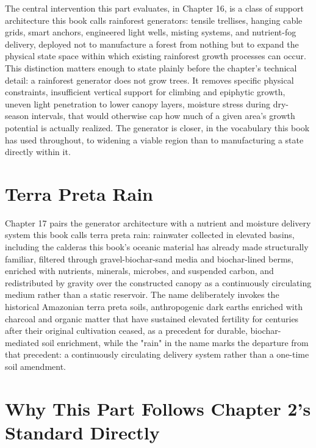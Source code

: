\documentclass[11pt,oneside]{book}
\begin{document}
The central intervention this part evaluates, in Chapter 16, is a class of support architecture this book calls rainforest generators: tensile trellises, hanging cable grids, smart anchors, engineered light wells, misting systems, and nutrient-fog delivery, deployed not to manufacture a forest from nothing but to expand the physical state space within which existing rainforest growth processes can occur. This distinction matters enough to state plainly before the chapter's technical detail: a rainforest generator does not grow trees. It removes specific physical constraints, insufficient vertical support for climbing and epiphytic growth, uneven light penetration to lower canopy layers, moisture stress during dry-season intervals, that would otherwise cap how much of a given area's growth potential is actually realized. The generator is closer, in the vocabulary this book has used throughout, to widening a viable region than to manufacturing a state directly within it.

\section*{Terra Preta Rain}

Chapter 17 pairs the generator architecture with a nutrient and moisture delivery system this book calls terra preta rain: rainwater collected in elevated basins, including the calderas this book's oceanic material has already made structurally familiar, filtered through gravel-biochar-sand media and biochar-lined berms, enriched with nutrients, minerals, microbes, and suspended carbon, and redistributed by gravity over the constructed canopy as a continuously circulating medium rather than a static reservoir. The name deliberately invokes the historical Amazonian terra preta soils, anthropogenic dark earths enriched with charcoal and organic matter that have sustained elevated fertility for centuries after their original cultivation ceased, as a precedent for durable, biochar-mediated soil enrichment, while the "rain" in the name marks the departure from that precedent: a continuously circulating delivery system rather than a one-time soil amendment.

\section*{Why This Part Follows Chapter 2's Standard Directly}
\end{document}
